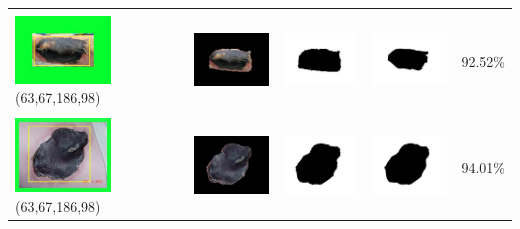 \begin{table}[H]
\begin{tabular}{|m{1.0in}|m{1.0in}|m{1.0in}|m{1.0in}|m{0.6in}|}
		&  &  & \\
		\includegraphics[width=1.0in]{gambar/hasil_segmentasi/luka_hitam/image_22_rect.jpg} {\centering\fontsize{10}{10}\selectfont(63,67,186,98)}&
		\includegraphics[width=1.0in]{gambar/hasil_segmentasi/luka_hitam/result_22.jpg}&
		\includegraphics[width=1.0in]{gambar/hasil_segmentasi/luka_hitam/mask_r_22.jpg}&
		\includegraphics[width=1.0in]{gambar/hasil_segmentasi/luka_hitam/22_r.jpg}&
		92.52\% \\
		\hline 
				
		&  &  & \\
		\includegraphics[width=1.0in]{gambar/hasil_segmentasi/luka_hitam/image_26_rect.jpg} {\centering\fontsize{10}{10}\selectfont(63,67,186,98)}&
		\includegraphics[width=1.0in]{gambar/hasil_segmentasi/luka_hitam/result_26.jpg}&
		\includegraphics[width=1.0in]{gambar/hasil_segmentasi/luka_hitam/mask_r_26.jpg}&
		\includegraphics[width=1.0in]{gambar/hasil_segmentasi/luka_hitam/26_r.jpg}&
		94.01\% \\
		\hline 


\end{tabular}
\end{table}
